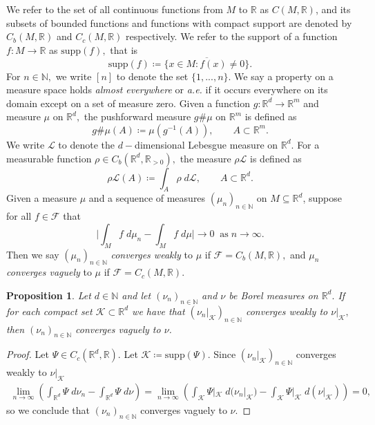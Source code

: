 \documentclass{article}
\newtheorem{prop}[define]{Proposition}
\newcommand{\R}{\mathbb{R}}
\newcommand{\N}{\mathbb{N}}
\begin{document}
We refer to the set of all continuous functions from $M$ to $\R$ as $C(M,\R)$, and its subsets of bounded functions and functions with compact support are denoted by $C_b(M, \R)$ and $C_c(M,\R)$ respectively. We refer to the support of a function $f:M \to \R$ as $\text{supp}(f),$ that is
$$\text{supp}(f) \coloneqq \overline{\{x \in M: f(x) \neq 0\}}.$$
For $n \in \mathbb{N},$ we write $[n]$ to denote the set $\{1,...,n\}.$ 
We say a property on a measure space holds \emph{almost everywhere} or \emph{a.e.} if it occurs everywhere on its domain except on a set of measure zero. 
Given a function $g:\R^d\to \R^m$ and measure $\mu$ on $\R^d,$ the pushforward measure $g \# \mu$ on $\R^m$ is defined as
\begin{equation*}
    g \# \mu(A) \coloneqq \mu(g^{-1}(A)), \qquad A \subset \R^m.
\end{equation*}
We write $\mathcal{L}$ to denote the $d-$dimensional Lebesgue measure on $\mathbb{R}^d.$ For a measurable function $\rho\in C_b(\R^d,\R_{>0}),$ the measure $\rho\mathcal{L}$ is defined as
\begin{equation*}
    \rho \mathcal{L}(A) \coloneqq \int_{A}\rho\; d\mathcal{L}, \qquad A \subset \R^d.
\end{equation*} 
Given a measure $\mu$ and a sequence of measures $(\mu_n)_{n \in \N}$ on $M \subseteq \R^d$, suppose for all $f \in \mathcal{F}$ that
\begin{equation*}
    \bigg|\int_M f \; d\mu_n -\int_M f \; d\mu\bigg| \to 0 \;\; \text{as}  \; n \to \infty.
\end{equation*}Then we say $(\mu_n)_{n \in \N}$ \emph{converges weakly} to $\mu$ if $\mathcal{F} = C_b(M,\R),$ and $\mu_n$ \emph{converges vaguely} to $\mu$ if $\mathcal{F} = C_c(M, \R).$

\begin{prop} \label{prop: vague weak prop} Let $d \in \N$ and let $(\nu_n)_{n \in \N}$ and $\nu$ be Borel measures on $\R^d.$ If for each compact set $\mathcal{K} \subset \R^d$ we have that $(\nu_n|_\mathcal{K})_{n \in \N}$ converges weakly to $\nu|_{\mathcal{K}},$ then
     $(\nu_n)_{n \in \N}$ converges vaguely to $\nu$. 
     
\end{prop}
\begin{proof}
  Let $\Psi \in C_c(\R^d,\R).$ Let $\mathcal{K} \coloneqq \text{supp}(\Psi).$  Since $(\nu_n|_\mathcal{K})_{n \in \N}$ converges weakly to $\nu|_\mathcal{K}$
    \begin{equation*}
        \begin{split}
        \lim_{n \to \infty}\left(\int_{\R^d}\Psi\; d\nu_n - \int_{\R^d}\Psi \; d\nu\right) 
            = \lim_{n \to \infty}\left(\int_{\mathcal{K}} \Psi|_{\mathcal{K}}\;d(\nu_n|_{\mathcal{K}}) - \int_{\mathcal{K}} \Psi|_{\mathcal{K}}\;d(\nu|_{\mathcal{K}}) \right) = 0,
        \end{split}
    \end{equation*} so we conclude that $(\nu_n)_{n \in \N}$ converges vaguely to $\nu.$
\end{proof}
\end{document}
